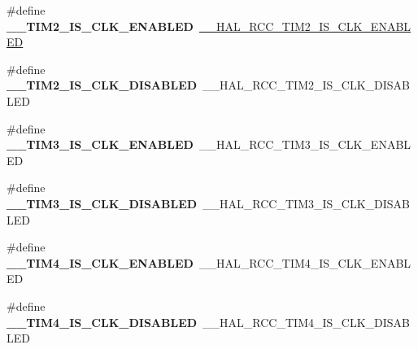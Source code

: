 \begin{DoxyCompactItemize}
\item 
\mbox{\label{group___h_a_l___r_c_c___aliased_gab47df1a0dae3104f5ead354b24c37a1e}} 
\#define {\bfseries \+\_\+\+\_\+\+T\+I\+M2\+\_\+\+I\+S\+\_\+\+C\+L\+K\+\_\+\+E\+N\+A\+B\+L\+ED}~\mbox{\hyperlink{group___r_c_c_ex___peripheral___clock___enable___disable___status_gadee5016adb1c8b62a5bb05f055859de0}{\+\_\+\+\_\+\+H\+A\+L\+\_\+\+R\+C\+C\+\_\+\+T\+I\+M2\+\_\+\+I\+S\+\_\+\+C\+L\+K\+\_\+\+E\+N\+A\+B\+L\+ED}}
\item 
\mbox{\label{group___h_a_l___r_c_c___aliased_gae39de686b2eac091789e171236cb2456}} 
\#define {\bfseries \+\_\+\+\_\+\+T\+I\+M2\+\_\+\+I\+S\+\_\+\+C\+L\+K\+\_\+\+D\+I\+S\+A\+B\+L\+ED}~\+\_\+\+\_\+\+H\+A\+L\+\_\+\+R\+C\+C\+\_\+\+T\+I\+M2\+\_\+\+I\+S\+\_\+\+C\+L\+K\+\_\+\+D\+I\+S\+A\+B\+L\+ED
\item 
\mbox{\label{group___h_a_l___r_c_c___aliased_ga7a81a91683178ecfc7ec096653e9afc8}} 
\#define {\bfseries \+\_\+\+\_\+\+T\+I\+M3\+\_\+\+I\+S\+\_\+\+C\+L\+K\+\_\+\+E\+N\+A\+B\+L\+ED}~\+\_\+\+\_\+\+H\+A\+L\+\_\+\+R\+C\+C\+\_\+\+T\+I\+M3\+\_\+\+I\+S\+\_\+\+C\+L\+K\+\_\+\+E\+N\+A\+B\+L\+ED
\item 
\mbox{\label{group___h_a_l___r_c_c___aliased_ga282a0aadb354b24a4ec554b29a4916f8}} 
\#define {\bfseries \+\_\+\+\_\+\+T\+I\+M3\+\_\+\+I\+S\+\_\+\+C\+L\+K\+\_\+\+D\+I\+S\+A\+B\+L\+ED}~\+\_\+\+\_\+\+H\+A\+L\+\_\+\+R\+C\+C\+\_\+\+T\+I\+M3\+\_\+\+I\+S\+\_\+\+C\+L\+K\+\_\+\+D\+I\+S\+A\+B\+L\+ED
\item 
\mbox{\label{group___h_a_l___r_c_c___aliased_ga88c7174931d62e7126a2d5f966377894}} 
\#define {\bfseries \+\_\+\+\_\+\+T\+I\+M4\+\_\+\+I\+S\+\_\+\+C\+L\+K\+\_\+\+E\+N\+A\+B\+L\+ED}~\+\_\+\+\_\+\+H\+A\+L\+\_\+\+R\+C\+C\+\_\+\+T\+I\+M4\+\_\+\+I\+S\+\_\+\+C\+L\+K\+\_\+\+E\+N\+A\+B\+L\+ED
\item 
\mbox{\label{group___h_a_l___r_c_c___aliased_ga18e5f75acae53aeff4a5ca7108096acb}} 
\#define {\bfseries \+\_\+\+\_\+\+T\+I\+M4\+\_\+\+I\+S\+\_\+\+C\+L\+K\+\_\+\+D\+I\+S\+A\+B\+L\+ED}~\+\_\+\+\_\+\+H\+A\+L\+\_\+\+R\+C\+C\+\_\+\+T\+I\+M4\+\_\+\+I\+S\+\_\+\+C\+L\+K\+\_\+\+D\+I\+S\+A\+B\+L\+ED

\end{DoxyCompactItemize}
